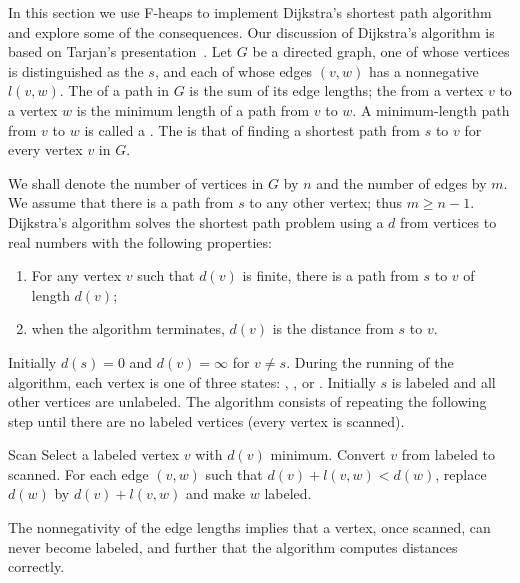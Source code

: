 In this section we use F-heaps to implement Dijkstra's shortest path algorithm~%
\cite{Dijkstra1959} and explore some of the consequences. Our discussion of
Dijkstra's algorithm is based on Tarjan's presentation~\cite{Tarjan1983}. Let \(G\)
be a directed graph, one of whose vertices is distinguished as the 
\(s\), and each of whose edges \((v, w)\) has a nonnegative  \(l(v,
w)\). The  of a path in \(G\) is the sum of its edge lengths; the
 from a vertex \(v\) to a vertex \(w\) is the minimum length of a path
from \(v\) to \(w\). A minimum-length path from \(v\) to \(w\) is called
a . The  is that of
finding a shortest path from \(s\) to \(v\) for every vertex \(v\) in \(G\).

We shall denote the number of vertices in \(G\) by \(n\) and the number of edges by
\(m\). We assume that there is a path from \(s\) to any other vertex; thus \(m \geq
n - 1\). Dijkstra's algorithm solves the shortest path problem using
a  \(d\) from vertices to real numbers with the
following properties:
\begin{enumerate}
	\item For any vertex \(v\) such that \(d(v)\) is finite, there is a path from
		\(s\) to \(v\) of length \(d(v)\);
	\item when the algorithm terminates, \(d(v)\) is the distance from \(s\) to
	\(v\).
\end{enumerate}

Initially \(d(s) = 0\) and \(d(v) = \infty\) for \(v \neq s\). During the running of the algorithm, each vertex is one of three states: , , or . Initially \(s\) is labeled and all other vertices are unlabeled. The algorithm consists of repeating the following step until there are no labeled vertices (every vertex is scanned).

\begin{step}{Scan}
	Select a labeled vertex \(v\) with \(d(v)\) minimum. Convert \(v\) from labeled
	to scanned. For each edge \((v, w)\) such that \(d(v) + l(v, w) < d(w)\), replace
	\(d(w)\) by \(d(v) + l(v, w)\) and make \(w\) labeled.
\end{step}

The nonnegativity of the edge lengths implies that a vertex, once scanned, can never
become labeled, and further that the algorithm computes distances correctly.

